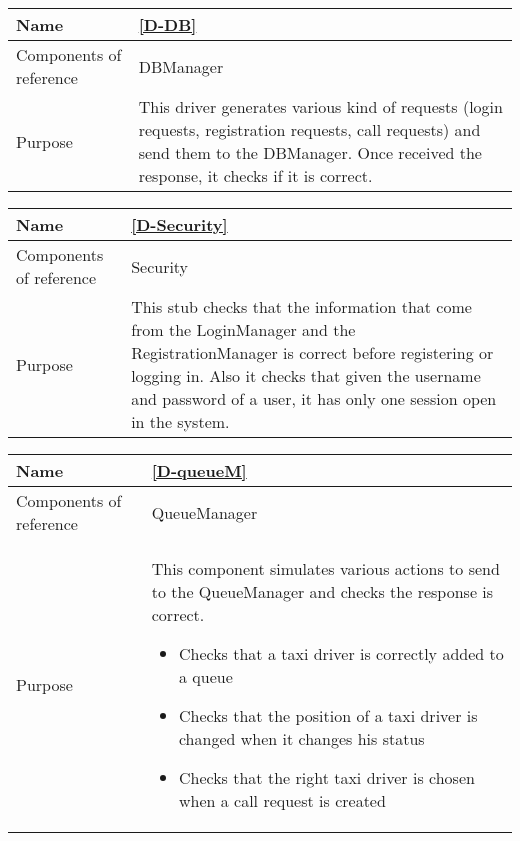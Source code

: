\begin{table}[H]
    \begin{tabularx}{\textwidth}{l|X}
        \hline
        Name
        & 
        \ref{D-DB}
        \\ \hline
        Components of reference 
        & 
        DBManager
        \\ \hline
        Purpose
        & 
        This driver generates various kind of requests (login requests, registration requests, call requests) and send them to the DBManager. Once received the response, it checks if it is correct.
        \\ \hline
    \end{tabularx}
\end{table}

\begin{table}[H]
    \begin{tabularx}{\textwidth}{l|X}
        \hline
        Name
        & 
        \ref{D-Security}
        \\ \hline
        Components of reference 
        & 
        Security
        \\ \hline
        Purpose
        & 
        This stub checks that the information that come from the LoginManager and the RegistrationManager is correct before registering or logging in. Also it checks that given the username and password of a user, it has only one session open in the system.
        \\ \hline
    \end{tabularx}
\end{table}

\begin{table}[H]
    \begin{tabularx}{\textwidth}{l|X}
        \hline
        Name
        & 
        \ref{D-queueM}
        \\ \hline
        Components of reference 
        & 
        QueueManager
        \\ \hline
        Purpose
        & 
        This component simulates various actions to send to the QueueManager and checks the response is correct.
        \begin{itemize}
            \item Checks that a taxi driver is correctly added to a queue
            \item Checks that the position of a taxi driver is changed when it changes his status
            \item Checks that the right taxi driver is chosen when a call request is created
        \end{itemize}
        \\ \hline
    \end{tabularx}
\end{table}

